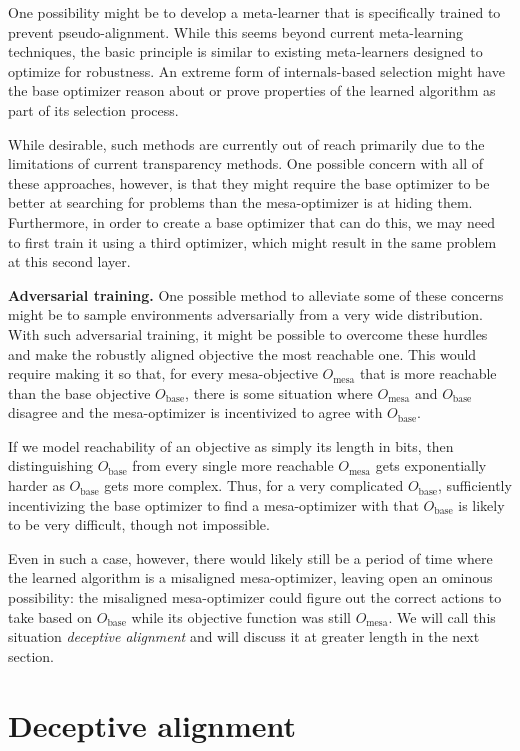 \documentclass[
  onecolumn,
  natbib,
]{miri-tech-article}
\begin{document}
One possibility might be to develop a meta-learner that is specifically trained to prevent pseudo-alignment. While this seems beyond current meta-learning techniques, the basic principle is similar to existing meta-learners designed to optimize for robustness. An extreme form of internals-based selection might have the base optimizer reason about or prove properties of the learned algorithm as part of its selection process.

While desirable, such methods are currently out of reach primarily due to the limitations of current transparency methods. One possible concern with all of these approaches, however, is that they might require the base optimizer to be better at searching for problems than the mesa-optimizer is at hiding them. Furthermore, in order to create a base optimizer that can do this, we may need to first train it using a third optimizer, which might result in the same problem at this second layer.

\textbf{Adversarial training.} One possible method to alleviate some of these concerns might be to sample environments adversarially from a very wide distribution. With such adversarial training, it might be possible to overcome these hurdles and make the robustly aligned objective the most reachable one. This would require making it so that, for every mesa-objective $O_\text{mesa}$ that is more reachable than the base objective $O_\text{base}$, there is some situation where $O_\text{mesa}$ and $O_\text{base}$ disagree and the mesa-optimizer is incentivized to agree with $O_\text{base}$.

If we model reachability of an objective as simply its length in bits, then distinguishing $O_\text{base}$ from every single more reachable $O_\text{mesa}$ gets exponentially harder as $O_\text{base}$ gets more complex. Thus, for a very complicated $O_\text{base}$, sufficiently incentivizing the base optimizer to find a mesa-optimizer with that $O_\text{base}$ is likely to be very difficult, though not impossible.

Even in such a case, however, there would likely still be a period of time where the learned algorithm is a misaligned mesa-optimizer, leaving open an ominous possibility: the misaligned mesa-optimizer could figure out the correct actions to take based on $O_\text{base}$ while its objective function was still $O_\text{mesa}$. We will call this situation \textit{deceptive alignment} and will discuss it at greater length in the next section.

\section{Deceptive alignment}
\label{sec:4}
\end{document}
